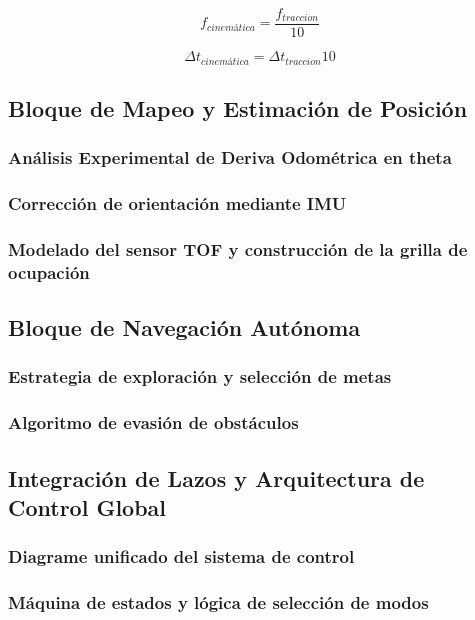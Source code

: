 \begin{equation*}
	f_{cinemática}=\frac{f_{traccion}}{10}
\end{equation*}

\begin{equation*}
	\Delta t_{cinemática}=\Delta t_{traccion}10
\end{equation*}


\subsection{Bloque de Mapeo y Estimación de Posición}


\subsubsection{Análisis Experimental de Deriva Odométrica en theta}


\subsubsection{Corrección de orientación mediante IMU}


\subsubsection{Modelado del sensor TOF y construcción de la grilla de ocupación}




\subsection{Bloque de Navegación Autónoma}


\subsubsection{Estrategia de exploración y selección de metas}


\subsubsection{Algoritmo de evasión de obstáculos}




\subsection{Integración de Lazos y Arquitectura de Control Global}


\subsubsection{Diagrame unificado del sistema de control}


\subsubsection{Máquina de estados y lógica de selección de modos}